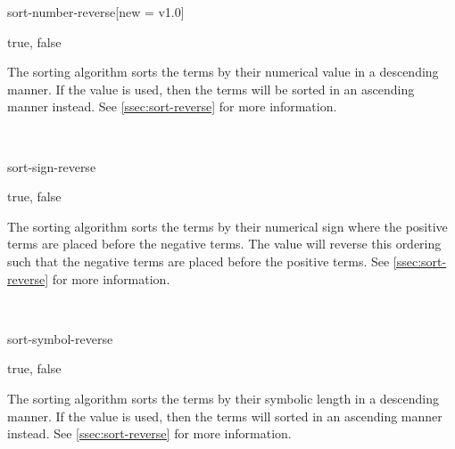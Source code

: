 \begin{option}{sort-number-reverse}[new = v1.0]
	\begin{values}[default = false]
		true, false
	\end{values}
	The sorting algorithm  sorts the terms by their numerical value in a descending manner. If the value  is used, then the terms will be sorted in an ascending manner instead. See \cref{ssec:sort-reverse} for more information.
	\begin{example}
		 \\
	\end{example}
\end{option}

\begin{option}{sort-sign-reverse}
	\begin{values}[default = false]
		true, false
	\end{values}
	The sorting algorithm  sorts the terms by their numerical sign where the positive terms are placed before the negative terms. The value  will reverse this ordering such that the negative terms are placed before the positive terms. See \cref{ssec:sort-reverse} for more information.
	\begin{example}
		\pdv[sort-sign-reverse=false, sort-method=sign, order=a-b]{f}{x} \\
		\pdv[sort-sign-reverse=true, sort-method=sign, order=a-b]{f}{x}
	\end{example}
\end{option}

\begin{option}{sort-symbol-reverse}
	\begin{values}[default = false]
		true, false
	\end{values}
	The sorting algorithm  sorts the terms by their symbolic length in a descending manner. If the value  is used, then the terms will sorted in an ascending manner instead. See \cref{ssec:sort-reverse} for more information.
	\begin{example}
		\pdv[sort-symbol-reverse=false, sort-method=symbol, order=ab+c]{f}{x} \\
		\pdv[sort-symbol-reverse=true, sort-method=symbol, order=ab+c]{f}{x}
	\end{example}
\end{option}

